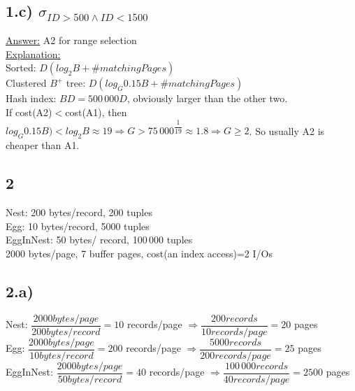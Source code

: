 \documentclass[12pt]{article}
\begin{document}
	\subsection*{1.c) $\sigma_{ID>500 \land ID<1500}$}
		\underline{Answer:} A2 for range selection\\
		\underline{Explanation:} \\
		Sorted: $D(log_2{B}+\#matchingPages)$ \\
		Clustered $B^+$ tree: $D(log_{G}{0.15B}+\#matchingPages)$ \\
		Hash index: $BD=500\,000D$, obviously larger than the other two.\\
		If cost(A2)$<$cost(A1), then $log_{G}{0.15B})<log_2{B}\approx 19\Rightarrow G>75\,000^{\dfrac{1}{19}}\approx1.8\Rightarrow G\geq 2$. So usually A2 is cheaper than A1.
	
	\subsection*{2}
	Nest: 200 bytes/record, 200 tuples\\
	Egg: 10 bytes/record, 5000 tuples\\
	EggInNest: 50 bytes/ record, 100\,000 tuples\\
	2000 bytes/page, 7 buffer pages, cost(an index access)=2 I/Os 
	\subsection*{2.a)}
Nest: $\dfrac{2000bytes/page}{200bytes/record}=10$ records/page $\Rightarrow\dfrac{200 records}{10 records/page}=20$ pages\\
Egg: $\dfrac{2000bytes/page}{10bytes/record}=200$ records/page $\Rightarrow\dfrac{5000 records}{200 records/page}=25$ pages\\
EggInNest: $\dfrac{2000bytes/page}{50bytes/record}=40$ records/page $\Rightarrow\dfrac{100\,000 records}{40 records/page}=2500$ pages\\
\end{document}
